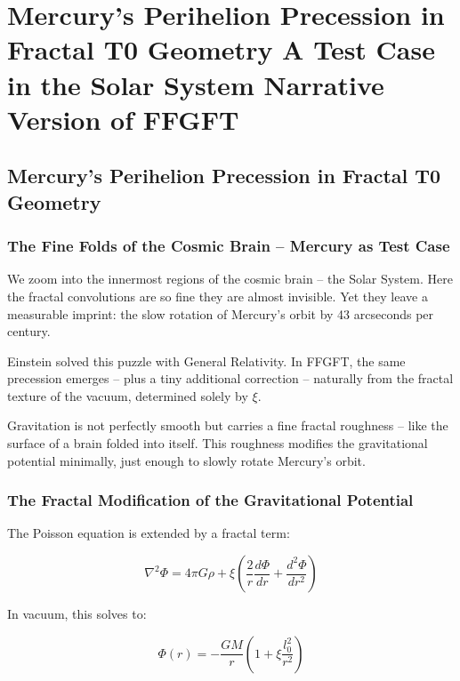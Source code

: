 \chapter{Mercury's Perihelion Precession in Fractal T0 Geometry  A Test Case in the Solar System  Narrative Version of FFGFT}


\section{Mercury's Perihelion Precession in Fractal T0 Geometry}
	
	\subsection*{The Fine Folds of the Cosmic Brain – Mercury as Test Case}
	
	We zoom into the innermost regions of the cosmic brain – the Solar System. Here the fractal convolutions are so fine they are almost invisible. Yet they leave a measurable imprint: the slow rotation of Mercury's orbit by 43 arcseconds per century.
	
	Einstein solved this puzzle with General Relativity. In FFGFT, the same precession emerges – plus a tiny additional correction – naturally from the fractal texture of the vacuum, determined solely by $\xi$.
	
	Gravitation is not perfectly smooth but carries a fine fractal roughness – like the surface of a brain folded into itself. This roughness modifies the gravitational potential minimally, just enough to slowly rotate Mercury's orbit.
	
	\subsection*{The Fractal Modification of the Gravitational Potential}
	
	The Poisson equation is extended by a fractal term:
	
	\begin{equation}
		\nabla^2 \Phi = 4\pi G \rho + \xi \left( \frac{2}{r} \frac{d\Phi}{dr} + \frac{d^2 \Phi}{dr^2} \right)
	\end{equation}
	
	In vacuum, this solves to:
	
	\begin{equation}
		\Phi(r) = -\frac{GM}{r} \left( 1 + \xi \frac{l_0^2}{r^2} \right)
	\end{equation}
	
